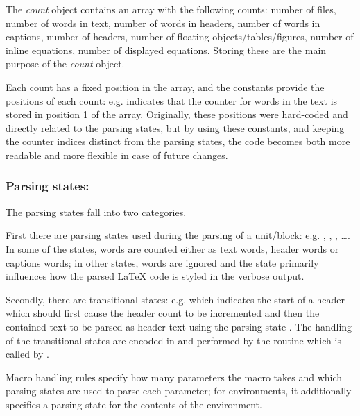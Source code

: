 \documentclass{article}
\newcommand\Obj[1]{\textsl{#1}}
\newcommand\wild{\ldots}
\begin{document}
The \Obj{count} object contains an array with the following counts: number of files, number of words in text, number of words in headers, number of words in captions, number of headers, number of floating objects/tables/figures, number of inline equations, number of displayed equations. Storing these are the main purpose of the \Obj{count} object.

Each count has a fixed position in the array, and the \code{\$CNT_\wild} constants provide the positions of each count: e.g.  indicates that the counter for words in the text is stored in position 1 of the array. Originally, these positions were hard-coded and directly related to the parsing states, but by using these constants, and keeping the counter indices distinct from the parsing states, the code becomes both more readable and more flexible in case of future changes.

\subsubsection{Parsing states: \code{\$STATE_\wild}}

The parsing states fall into two categories.

First there are parsing states used during the parsing of a unit/block: e.g. , , , \ldots. In some of the states, words are counted either as text words, header words or captions words; in other states, words are ignored and the state primarily influences how the parsed \LaTeX{} code is styled in the verbose output.

Secondly, there are transitional states: e.g.  which indicates the start of a header which should first cause the header count to be incremented and then the contained text to be parsed as header text using the parsing state . The handling of the transitional states are encoded in  and performed by the  routine which is called by .

Macro handling rules specify how many parameters the macro takes and which parsing states are used to parse each parameter; for environments, it additionally specifies a parsing state for the contents of the environment.
\end{document}
